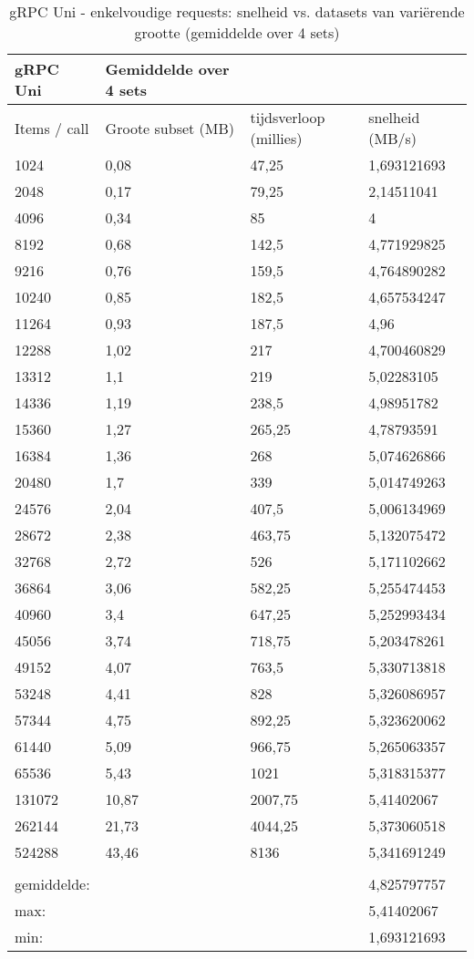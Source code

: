 \begin{table}
    \centering
    \begin{tabular}{llll}
        \toprule
        \textbf{gRPC Uni} & {Gemiddelde over 4 sets} &  & \\
        \midrule
        Items / call & Groote subset (MB) & tijdsverloop (millies) & snelheid (MB/s) \\
        1024 & 0,08 & 47,25 & 1,693121693 \\
        2048 & 0,17 & 79,25 & 2,14511041 \\
        4096 & 0,34 & 85 & 4 \\
        8192 & 0,68 & 142,5 & 4,771929825 \\
        9216 & 0,76 & 159,5 & 4,764890282 \\
        10240 & 0,85 & 182,5 & 4,657534247 \\
        11264 & 0,93 & 187,5 & 4,96 \\
        12288 & 1,02 & 217 & 4,700460829 \\
        13312 & 1,1 & 219 & 5,02283105 \\
        14336 & 1,19 & 238,5 & 4,98951782 \\
        15360 & 1,27 & 265,25 & 4,78793591 \\
        16384 & 1,36 & 268 & 5,074626866 \\
        20480 & 1,7 & 339 & 5,014749263 \\
        24576 & 2,04 & 407,5 & 5,006134969 \\
        28672 & 2,38 & 463,75 & 5,132075472 \\
        32768 & 2,72 & 526 & 5,171102662 \\
        36864 & 3,06 & 582,25 & 5,255474453 \\
        40960 & 3,4 & 647,25 & 5,252993434 \\
        45056 & 3,74 & 718,75 & 5,203478261 \\
        49152 & 4,07 & 763,5 & 5,330713818 \\
        53248 & 4,41 & 828 & 5,326086957 \\
        57344 & 4,75 & 892,25 & 5,323620062 \\
        61440 & 5,09 & 966,75 & 5,265063357 \\
        65536 & 5,43 & 1021 & 5,318315377 \\
        131072 & 10,87 & 2007,75 & 5,41402067 \\
        262144 & 21,73 & 4044,25 & 5,373060518 \\
        524288 & 43,46 & 8136 & 5,341691249 \\
         &  &  &  \\
        gemiddelde: &  &  & 4,825797757 \\
        max: &  &  & 5,41402067 \\
        min: &  &  & 1,693121693 \\
        \bottomrule
    \end{tabular}
    \caption{gRPC Uni - enkelvoudige requests: snelheid vs. datasets van vari\"erende grootte (gemiddelde over 4 sets)}
    \label{tab:gRPCUnienkelvoudig}
\end{table}


